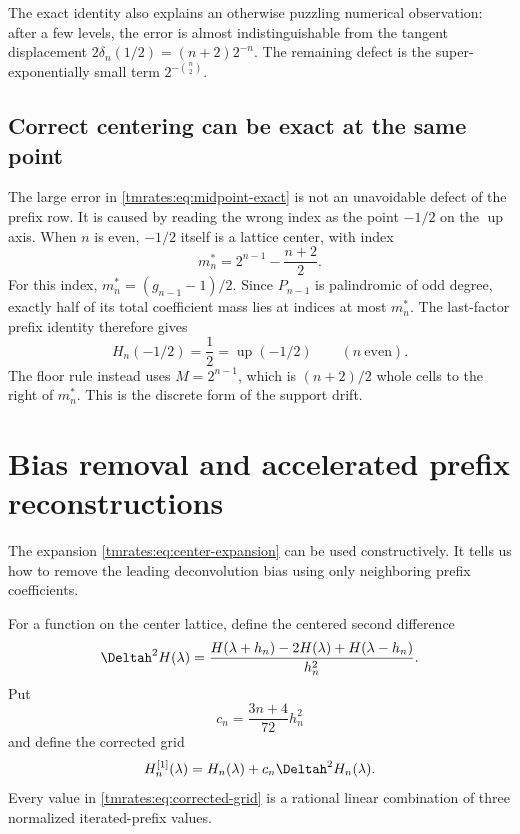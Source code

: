 \documentclass[11pt,oneside]{article}
\theoremstyle{definition}
\theoremstyle{remark}
\newcommand{\Up}{\operatorname{up}}
\begin{document}
The exact identity also explains an otherwise puzzling numerical observation: after a few
levels, the error is almost indistinguishable from the tangent displacement
$2\delta_n(1/2)=(n+2)2^{-n}$.  The remaining defect is the super-exponentially small term
$2^{-\binom n2}$.

\subsection{Correct centering can be exact at the same point}

The large error in \eqref{tmrates:eq:midpoint-exact} is not an unavoidable defect of the prefix row.
It is caused by reading the wrong index as the point $-1/2$ on the $\Up$ axis.  When $n$ is
even, $-1/2$ itself is a lattice center, with index
\begin{equation}
 m_n^*=2^{n-1}-\frac{n+2}{2}.                              \label{tmrates:eq:midpoint-correct-index}
\end{equation}
For this index, $m_n^*=(g_{n-1}-1)/2$.  Since $P_{n-1}$ is palindromic of odd degree, exactly
half of its total coefficient mass lies at indices at most $m_n^*$.  The last-factor prefix
identity therefore gives
\begin{equation}
 H_n(-1/2)=\frac12=\Up(-1/2) \qquad(n\ \text{even}).       \label{tmrates:eq:midpoint-centered-exact}
\end{equation}
The floor rule instead uses $M=2^{n-1}$, which is $(n+2)/2$ whole cells to the right of
$m_n^*$.  This is the discrete form of the support drift.

\section{Bias removal and accelerated prefix reconstructions}
\label{tmrates:sec:acceleration}

The expansion \eqref{tmrates:eq:center-expansion} can be used constructively.  It tells us how to
remove the leading deconvolution bias using only neighboring prefix coefficients.

For a function on the center lattice, define the centered second difference
\begin{equation}
 \Deltah^2H(\lambda)
 =\frac{H(\lambda+h_n)-2H(\lambda)+H(\lambda-h_n)}{h_n^2}. \label{tmrates:eq:discrete-laplacian}
\end{equation}
Put
\begin{equation}
 c_n=\frac{3n+4}{72}h_n^2
\end{equation}
and define the corrected grid
\begin{equation}
 H_n^{[1]}(\lambda)=H_n(\lambda)+c_n\Deltah^2H_n(\lambda). \label{tmrates:eq:corrected-grid}
\end{equation}
Every value in \eqref{tmrates:eq:corrected-grid} is a rational linear combination of three normalized
iterated-prefix values.
\end{document}

